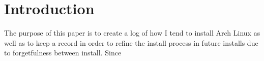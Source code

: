 \section{Introduction}
The purpose of this paper is to create a log of how I tend to install Arch Linux as well as to keep a record in order to refine the install process in future installs due to forgetfulness  between install.
Since 